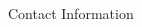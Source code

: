 \documentclass[final,hyperref={pdfpagelabels=false}]{beamer}
\begin{document}
\begin{frame}[t]
\begin{columns}[t]
\begin{column}{.465\textwidth}
\begin{block}{Contact Information}
\end{block}


\end{column} %

\begin{column}{.015\textwidth}\end{column} %

\end{columns} %

\end{frame} %
\end{document}
